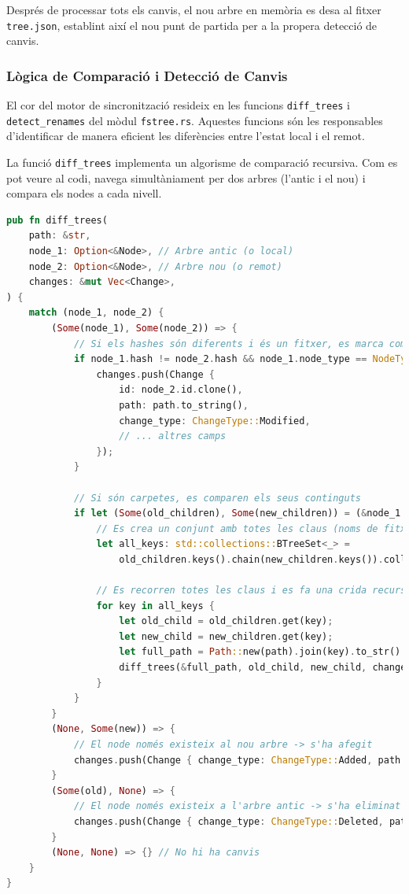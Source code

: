 Després de processar tots els canvis, el nou arbre en memòria es desa al fitxer \texttt{tree.json}, establint així el nou punt de partida per a la propera detecció de canvis.

\subsubsection{Lògica de Comparació i Detecció de Canvis}
El cor del motor de sincronització resideix en les funcions \texttt{diff\_trees} i \texttt{detect\_renames} del mòdul \texttt{fstree.rs}. Aquestes funcions són les responsables d'identificar de manera eficient les diferències entre l'estat local i el remot.

La funció \texttt{diff\_trees} implementa un algorisme de comparació recursiva. Com es pot veure al codi, navega simultàniament per dos arbres (l'antic i el nou) i compara els nodes a cada nivell.

\begin{lstlisting}[language=Rust, caption={Lògica de la funció \texttt{diff\_trees} a \texttt{fstree.rs}}]
pub fn diff_trees(
    path: &str,
    node_1: Option<&Node>, // Arbre antic (o local)
    node_2: Option<&Node>, // Arbre nou (o remot)
    changes: &mut Vec<Change>,
) {
    match (node_1, node_2) {
        (Some(node_1), Some(node_2)) => {
            // Si els hashes són diferents i és un fitxer, es marca com a modificat
            if node_1.hash != node_2.hash && node_1.node_type == NodeType::File {
                changes.push(Change {
                    id: node_2.id.clone(),
                    path: path.to_string(),
                    change_type: ChangeType::Modified,
                    // ... altres camps
                });
            }

            // Si són carpetes, es comparen els seus continguts
            if let (Some(old_children), Some(new_children)) = (&node_1.content, &node_2.content) {
                // Es crea un conjunt amb totes les claus (noms de fitxer) dels dos directoris
                let all_keys: std::collections::BTreeSet<_> =
                    old_children.keys().chain(new_children.keys()).collect();

                // Es recorren totes les claus i es fa una crida recursiva
                for key in all_keys {
                    let old_child = old_children.get(key);
                    let new_child = new_children.get(key);
                    let full_path = Path::new(path).join(key).to_str().unwrap().to_string();
                    diff_trees(&full_path, old_child, new_child, changes);
                }
            }
        }
        (None, Some(new)) => {
            // El node només existeix al nou arbre -> s'ha afegit
            changes.push(Change { change_type: ChangeType::Added, path: path.to_string(), ..Default::default() });
        }
        (Some(old), None) => {
            // El node només existeix a l'arbre antic -> s'ha eliminat
            changes.push(Change { change_type: ChangeType::Deleted, path: path.to_string(), ..Default::default() });
        }
        (None, None) => {} // No hi ha canvis
    }
}
\end{lstlisting}

